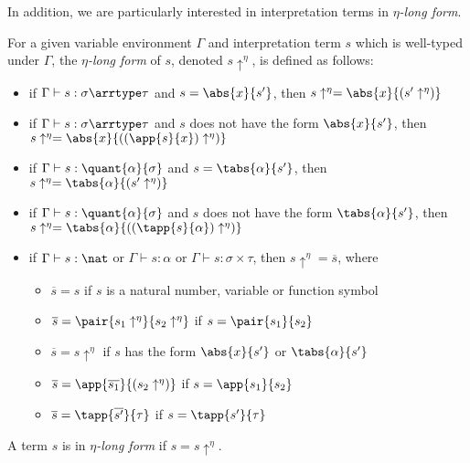 

\newcommand{\arreta}{\rightarrow_\eta}
\newcommand{\etalong}[1]{#1\uparrow^\eta}
\newcommand{\almostetalong}[1]{\overline{#1}}

In addition, we are particularly interested in interpretation terms in
\emph{$\eta$-long form}.

\begin{definition}
For a given variable environment $\Gamma$ and interpretation term $s$
which is well-typed under $\Gamma$, the \emph{$\eta$-long form} of $s$,
denoted $\etalong{s}$, is defined as follows:
\begin{itemize}
\item if $\Gamma \vdash s : \sigma \arrtype \tau$ and $s = \abs{x}{s'}$,
  then $\etalong{s} =  \abs{x}{(\etalong{s'})}$
\item if $\Gamma \vdash s : \sigma \arrtype \tau$ and $s$ does not have
  the form $\abs{x}{s'}$, then $\etalong{s} =  \abs{x}{(
  \etalong{(\app{s}{x})})}$
\item if $\Gamma \vdash s : \quant{\alpha}{\sigma}$ and $s = \tabs{
  \alpha}{s'}$, then $\etalong{s} = \tabs{\alpha}{(\etalong{s'})}$
\item if $\Gamma \vdash s : \quant{\alpha}{\sigma}$ and $s$ does not have
  the form $\tabs{\alpha}{s'}$, then $\etalong{s} = \tabs{\alpha}{
  (\etalong{(\tapp{s}{\alpha})})}$
\item if $\Gamma \vdash s : \nat$ or $\Gamma \vdash s : \alpha$ or
  $\Gamma \vdash s : \sigma \times \tau$, then $\etalong{s} =
  \almostetalong{s}$, where
  \begin{itemize}
  \item $\almostetalong{s} = s$ if $s$ is a natural number, variable or
    function symbol
  \item $\almostetalong{s} = \pair{\etalong{s_1}}{\etalong{s_2}}$ if
    $s = \pair{s_1}{s_2}$
  \item $\almostetalong{s} = \etalong{s}$ if $s$ has the form
    $\abs{x}{s'}$ or $\tabs{\alpha}{s'}$
  \item $\almostetalong{s} = \app{\almostetalong{s_1}}{(\etalong{s_2})}$
    if $s = \app{s_1}{s_2}$
  \item $\almostetalong{s} = \tapp{\almostetalong{s'}}{\tau}$
    if $s = \tapp{s'}{\tau}$
  \end{itemize}
\end{itemize}
A term $s$ is in \emph{$\eta$-long form} if $s = \etalong{s}$.
\end{definition}

